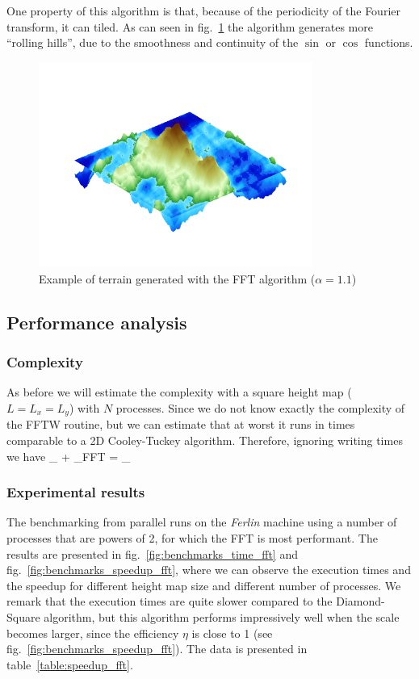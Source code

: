 One property of this algorithm is that, because of the periodicity of the Fourier transform, it can tiled. As can seen in fig.~\ref{fig:fft3d} the algorithm generates more  ``rolling hills'', due to the smoothness and continuity of the $\sin$ or $\cos$ functions.
\begin{figure}[htb]
\centering
    \includegraphics[width=0.8\textwidth]{img/fft3d.png}
    \caption{\label{fig:fft3d}Example of terrain generated with the FFT algorithm ($\alpha=1.1$)}
\end{figure}

\subsection{Performance analysis}
\subsubsection{Complexity}
As before we will estimate the complexity with  a square height map ($L = L_x =  L_y$) with $N$ processes. Since we do not know exactly the complexity of the FFTW routine, but we can estimate that at worst it runs in times comparable to a 2D Cooley-Tuckey algorithm. Therefore, ignoring writing times we have 
\be
    _{} + _{FFT} = _{}
\ee
\subsubsection{Experimental results}
The benchmarking from parallel runs on the {\em Ferlin} machine using a  number of processes that are powers of 2, for which the FFT is most performant. 
The results are presented in fig.~\ref{fig:benchmarks_time_fft}  and fig.~\ref{fig:benchmarks_speedup_fft}, where we can observe the execution times and the speedup for different height map size and different number of processes. 
We remark that the execution times are quite slower compared to the Diamond-Square algorithm, but this algorithm performs impressively well when the scale becomes larger, since the efficiency $\eta$ is close to 1 (see fig.~\ref{fig:benchmarks_speedup_fft}). The data is presented in table~\ref{table:speedup_fft}.


